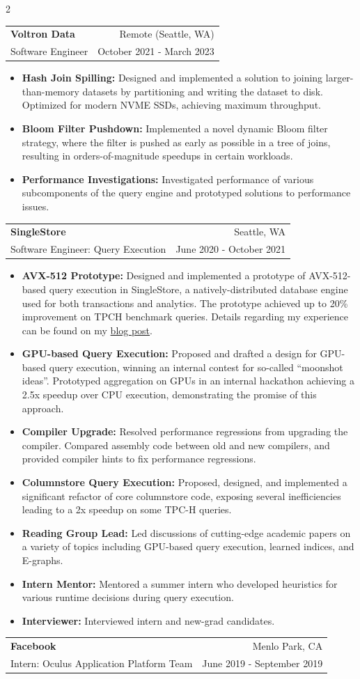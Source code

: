 \documentclass[letterpaper,11pt]{article}
\makeatletter
\newcommand{\resumeItem}[2]{
\vspace{-3pt}
\item\small{
    \textbf{#1}{\textbf{:} #2 \vspace{-2pt}}
  }
}
\newcommand{\resumeSubheading}[4]{
  \vspace{4pt}
  \begin{tabular*}{\textwidth}{l@{\extracolsep{\fill}}r}
    \textbf{#1} & #2 \\
    {\small#3} & {\small #4} \\
  \end{tabular*}\vspace{-5pt}
}
\newcommand{\resumeItemListStart}{\vspace{3pt}\begin{itemize}}
\newcommand{\resumeItemListEnd}{\end{itemize}\vspace{-5pt}}
\makeatother
\begin{document}
\begin{paracol}{2}
\begin{tcolorbox}[breakable]
\resumeSubheading{Voltron Data}{Remote (Seattle, WA)}
{Software Engineer}{October 2021 - March 2023}
\resumeItemListStart
\resumeItem{Hash Join Spilling}
{Designed and implemented a solution to joining larger-than-memory datasets by partitioning
  and writing the dataset to disk. Optimized for modern NVME SSDs, achieving maximum throughput.}
\resumeItem{Bloom Filter Pushdown}
{Implemented a novel dynamic Bloom filter strategy, where the filter is pushed as early as possible
  in a tree of joins, resulting in orders-of-magnitude speedups in certain workloads.}
\resumeItem{Performance Investigations}
{Investigated performance of various subcomponents of the query engine and prototyped solutions
  to performance issues.}
\resumeItemListEnd
\vspace{2pt}
\resumeSubheading{SingleStore}{Seattle, WA}
{Software Engineer: Query Execution}{June 2020 - October 2021}
\resumeItemListStart
\resumeItem{AVX-512 Prototype}
{Designed and implemented a prototype of AVX-512-based query execution in SingleStore, a
  natively-distributed database engine used for both transactions and analytics. The prototype
  achieved up to 20\% improvement on TPCH benchmark queries. Details regarding my experience
  can be found on my
  \href{https://www.singlestore.com/blog/a-programmers-perspective/}{blog post}.}
\resumeItem{GPU-based Query Execution}
{Proposed and drafted a design for GPU-based query execution, winning an internal contest
  for so-called ``moonshot ideas''. Prototyped aggregation on GPUs in an internal hackathon
  achieving a 2.5x speedup over CPU execution, demonstrating the promise of this approach.}
\resumeItem{Compiler Upgrade}
{Resolved performance regressions from upgrading the compiler. Compared assembly code between old and
  new compilers, and provided compiler hints to fix performance regressions.}
\resumeItem{Columnstore Query Execution}
{Proposed, designed, and implemented a significant refactor of core columnstore code,
  exposing several inefficiencies leading to a 2x speedup on some TPC-H queries.}
\resumeItem{Reading Group Lead}
{Led discussions of cutting-edge academic papers on a variety of topics including GPU-based
  query execution, learned indices, and E-graphs.}
\resumeItem{Intern Mentor}
{Mentored a summer intern who developed heuristics for various runtime decisions during
  query execution.}
\resumeItem{Interviewer}
{Interviewed intern and new-grad candidates.}
\resumeItemListEnd
\vspace{2pt}
\resumeSubheading
{Facebook}{Menlo Park, CA}
{Intern: Oculus Application Platform Team}{June 2019 - September 2019}

\end{tcolorbox}
\end{paracol}
\end{document}

